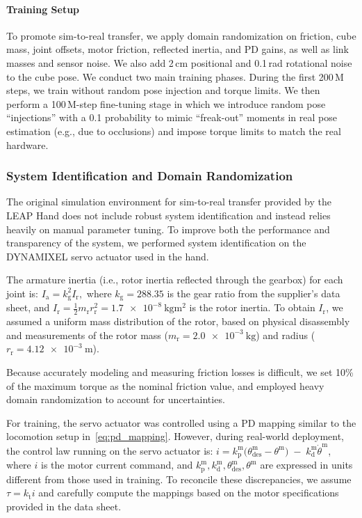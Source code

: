 \paragraph{Training Setup}  
To promote sim-to-real transfer, we apply domain randomization on friction, cube mass, joint offsets, motor friction, reflected inertia, and PD gains, as well as link masses and sensor noise. We also add 2\,cm positional and 0.1\,rad rotational noise to the cube pose. We conduct two main training phases. During the first 200\,M steps, we train without random pose injection and torque limits. We then perform a 100\,M-step fine-tuning stage in which we introduce random pose ``injections'' with a 0.1 probability to mimic ``freak-out'' moments in real pose estimation (e.g., due to occlusions) and impose torque limits to match the real hardware.

\subsubsection{System Identification and Domain Randomization}
The original simulation environment for sim-to-real transfer provided by the LEAP Hand \cite{shaw2023leaphand} does not include robust system identification and instead relies heavily on manual parameter tuning. To improve both the performance and transparency of the system, we performed system identification on the DYNAMIXEL servo actuator used in the hand.

The armature inertia (i.e., rotor inertia reflected through the gearbox) for each joint is:
$
I_\text{a} = k_\text{g}^2 I_\text{r},
$
where \( k_\text{g} = 288.35 \) is the gear ratio from the supplier's data sheet, and
$
I_\text{r} = \frac{1}{2} m_\text{r} r_\text{r}^2 = \SI{1.7e-8}{\kilogram\meter\squared}
$
is the rotor inertia. To obtain \(I_\text{r}\), we assumed a uniform mass distribution of the rotor, based on physical disassembly and measurements of the rotor mass (\(m_\text{r} = \SI{2.0e-3}{\kilogram}\)) and radius (\(r_\text{r} = \SI{4.12e-3}{\meter}\)).

Because accurately modeling and measuring friction losses is difficult, we set 10\% of the maximum torque as the nominal friction value, and employed heavy domain randomization to account for uncertainties. 

For training, the servo actuator was controlled using a PD mapping similar to the locomotion setup in~\eqref{eq:pd_mapping}. However, during real-world deployment, the control law running on the servo actuator is: $i = k_\text{p}^\text{m} \bigl(\theta_\text{des}^\text{m} - \theta^\text{m}\bigr)
\;-\;
k_\text{d}^\text{m} \dot{\theta}^\text{m}$,
where \(i\) is the motor current command, and \(k_\text{p}^\text{m}, k_\text{d}^\text{m}, \theta_\text{des}^\text{m}, \theta^\text{m}\) are expressed in units different from those used in training. To reconcile these discrepancies, we assume \(\tau = k_\text{t} i\) and carefully compute the mappings based on the motor specifications provided in the data sheet.


